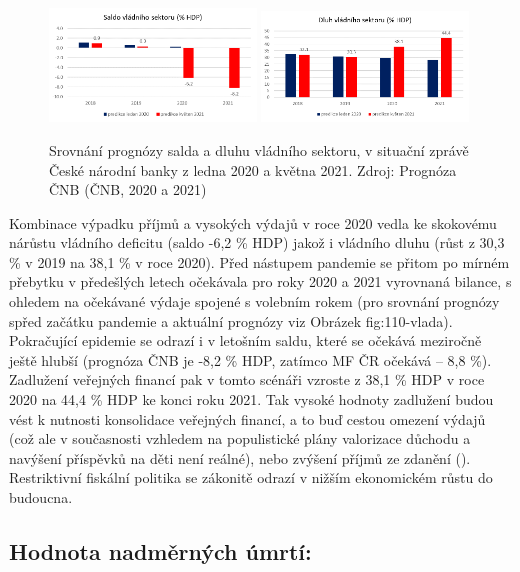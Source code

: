 \begin{figure}[ht]
    \centering
    \includegraphics[width=0.49\textwidth]{./pic/saldo.png} \includegraphics[width=0.49\textwidth]{./pic/dluh.png}
    \caption{Srovnání prognózy salda a dluhu vládního sektoru, v situační zprávě České národní banky z ledna 2020 a května 2021. Zdroj: Prognóza ČNB (ČNB, 2020 a 2021)}
    \label{fig:110-vlada}
\end{figure}

Kombinace výpadku příjmů a vysokých výdajů v roce 2020 vedla ke skokovému nárůstu vládního deficitu (saldo -6,2 \% HDP) jakož i vládního dluhu (růst z 30,3 \% v 2019 na 38,1 \% v roce 2020). Před nástupem pandemie se přitom po mírném přebytku v předešlých letech očekávala pro roky 2020 a 2021 vyrovnaná bilance, s ohledem na očekávané výdaje spojené s volebním rokem (pro srovnání prognózy spřed začátku pandemie a aktuální prognózy viz Obrázek fig:110-vlada).  Pokračující epidemie se odrazí i v letošním saldu, které se očekává meziročně ještě hlubší (prognóza ČNB je -8,2 \% HDP, zatímco MF ČR očekává – 8,8 \%). Zadlužení veřejných financí pak v tomto scénáři vzroste z 38,1 \% HDP v roce 2020 na 44,4 \% HDP ke konci roku 2021. Tak vysoké hodnoty zadlužení budou vést k nutnosti konsolidace veřejných financí, a to buď cestou omezení výdajů (což ale v současnosti vzhledem na populistické plány valorizace důchodu a navýšení příspěvků na děti není reálné), nebo zvýšení příjmů ze zdanění (\cite{NRR2021}). Restriktivní fiskální politika se zákonitě odrazí v nižším ekonomickém růstu do budoucna.

\subsection*{Hodnota nadměrných úmrtí:} 

